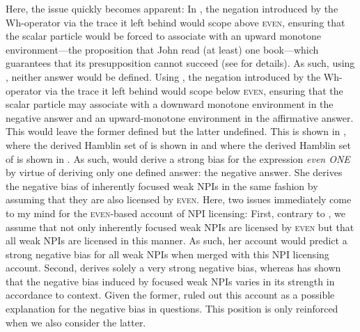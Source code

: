 Here, the issue quickly becomes apparent: In , the negation introduced by the Wh-operator via the trace it left behind would scope above {\scshape even}, ensuring that the scalar particle would be forced to associate with an upward monotone environment---the proposition that John read (at least) one book---which guarantees that its presupposition cannot succeed (see  for details). As such, using , neither answer would be defined. Using , the negation introduced by the Wh-operator via the trace it left behind would scope below {\scshape even}, ensuring that the scalar particle may associate with a downward monotone environment in the negative answer and an upward-monotone environment in the affirmative answer. This would leave the former defined but the latter undefined. This is shown in , where the derived Hamblin set of  is shown in  and where the derived Hamblin set of  is shown in .
\pex[nopreamble=true]\label{ex:guerzoni-even-lf-hamblin}%
\a{} {}
\a{} {}
\xe
As such, \textcite{Guerzoni2003,Guerzoni2004} would derive a strong bias for the expression \textit{even \MakeUppercase{one}} by virtue of deriving only one defined answer: the negative answer. She derives the negative bias of inherently focused weak NPIs in the same fashion by assuming that they are also licensed by {\scshape even}. Here, two issues immediately come to my mind for the {\scshape even}-based account of NPI licensing: First, contrary to \textcite{Guerzoni2003,Guerzoni2004}, we assume that not only inherently focused weak NPIs are licensed by {\scshape even} but that all weak NPIs are licensed in this manner. As such, her account would predict a strong negative bias for all weak NPIs when merged with this NPI licensing account. Second, \textcite{Guerzoni2003,Guerzoni2004} derives solely a very strong negative bias, whereas  has shown that the negative bias induced by focused weak NPIs varies in its strength in accordance to context. Given the former, \textcite{Crnic2014-dogma,Crnic2014-nm} ruled out this account as a possible explanation for the negative bias in questions. This position is only reinforced when we also consider the latter.

